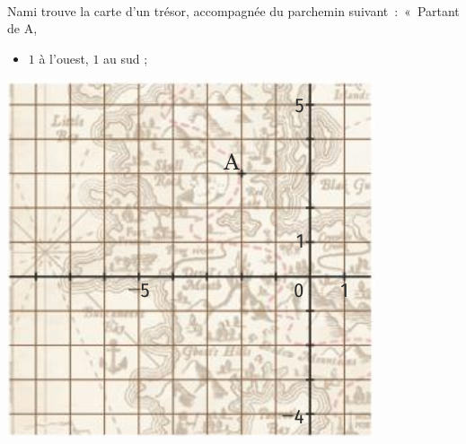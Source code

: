 \documentclass[11pt]{article}
\begin{document}
\begin{exo}~\\[-3mm]
  \begin{minipage}{.6\textwidth}
    Nami trouve la carte d'un trésor, accompagnée du parchemin
    suivant~:~«~Partant de A,
    \begin{itemize}
      \item $1$ à l'ouest, $1$ au sud ;
    \end{itemize}
  \end{minipage}
  \begin{minipage}{.4\textwidth}
    \begin{center}
      \includegraphics[scale=.4]{carte.png}
    \end{center}
  \end{minipage}
\end{exo}
\end{document}
